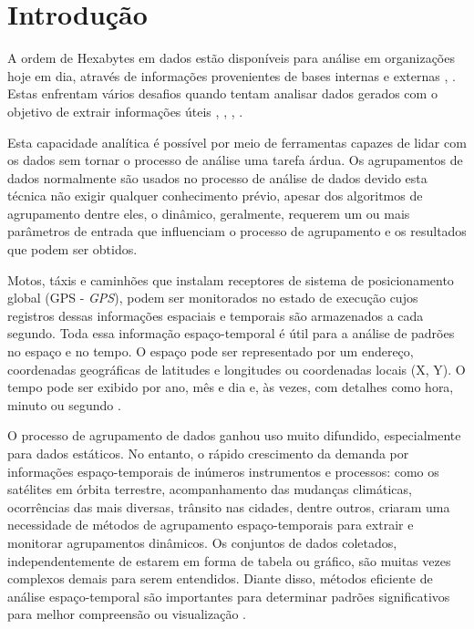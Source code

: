 \chapter{Introdução}
\label{chap:introducao}
A ordem de Hexabytes em dados estão disponíveis para análise em organizações hoje em dia, através de informações provenientes de bases internas e externas \cite{google}, \cite{bing}. Estas enfrentam vários desafios quando tentam analisar dados gerados com o objetivo de extrair informações úteis \cite{Wu2008}, \cite{Mitsa:2010}, \cite{cheng:2014}, \cite{Atluri:2018}.

Esta capacidade analítica é possível por meio de ferramentas capazes de lidar com os dados sem tornar o processo de análise uma tarefa árdua. Os agrupamentos de dados normalmente são usados no processo de análise de dados devido esta técnica não exigir qualquer conhecimento prévio, apesar dos algoritmos de agrupamento dentre eles, o dinâmico, geralmente, requerem um ou mais parâmetros de entrada que influenciam o processo de agrupamento e os resultados que podem ser obtidos. 

Motos, táxis e caminhões que instalam receptores de sistema de posicionamento global (\acrshort{GPS} - \emph{\acrlong{GPS}}), podem ser monitorados no estado de execução cujos registros dessas informações espaciais e temporais são armazenados a cada segundo. Toda essa informação espaço-temporal é útil para a análise de padrões no espaço e no tempo. O espaço pode ser representado por um endereço, coordenadas geográficas de latitudes e longitudes ou coordenadas locais (X, Y). O tempo pode ser exibido por ano, mês e dia e, às vezes, com detalhes como hora, minuto ou segundo \cite{Zhicheng:2019}.


O processo de agrupamento de dados ganhou uso muito difundido, especialmente para dados estáticos. No entanto, o rápido crescimento da demanda por informações espaço-temporais de inúmeros instrumentos e processos: como os satélites em órbita terrestre, acompanhamento das mudanças climáticas, ocorrências das mais diversas, trânsito nas cidades, dentre outros, criaram uma necessidade de métodos de agrupamento espaço-temporais para extrair e monitorar agrupamentos dinâmicos. Os conjuntos de dados coletados, independentemente de estarem em forma de tabela ou gráfico, são muitas vezes complexos demais para serem entendidos. Diante disso, métodos eficiente de análise espaço-temporal são importantes para determinar padrões significativos para melhor compreensão ou visualização \cite{Shekhar2011}.

